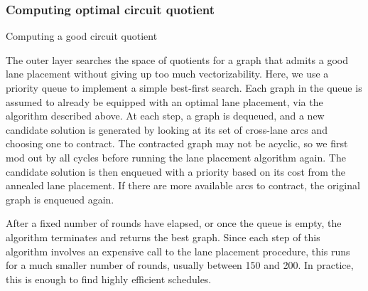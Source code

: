 \subsubsection*{Computing optimal circuit quotient}
\begin{algorithm}


    \caption{Computing a good circuit quotient}\label{alg:circuit-quotient}
\end{algorithm}
The outer layer searches the space of quotients for a graph that admits a good lane placement without giving up too much vectorizability.
Here, we use a priority queue to implement a simple best-first search.
Each graph in the queue is assumed to already be equipped with an optimal lane placement, via the algorithm described above.
At each step, a graph is dequeued, and a new candidate solution is generated by looking at its set of cross-lane arcs and choosing one to contract.
The contracted graph may not be acyclic, so we first mod out by all cycles before running the lane placement algorithm again.
The candidate solution is then enqueued with a priority based on its cost from the annealed lane placement.
If there are more available arcs to contract, the original graph is enqueued again.

After a fixed number of rounds have elapsed, or once the queue is empty, the algorithm terminates and returns the best graph.
Since each step of this algorithm involves an expensive call to the lane placement procedure, this runs for a much smaller number of rounds, usually between 150 and 200.
In practice, this is enough to find highly efficient schedules.





